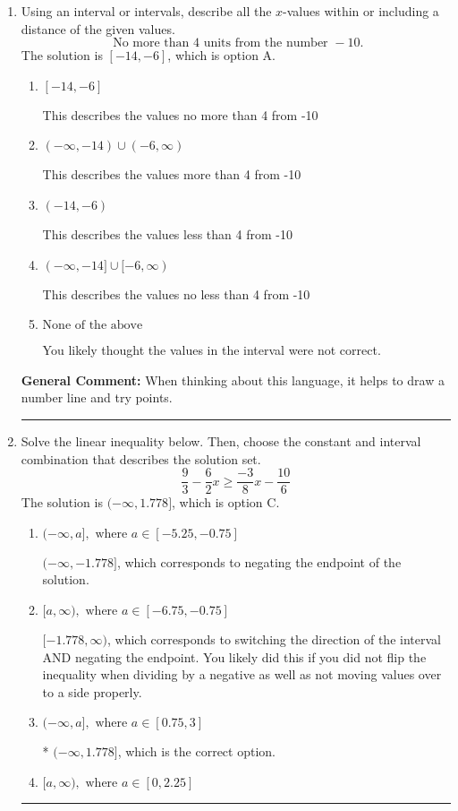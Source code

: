 \documentclass{extbook}[14pt]
\newcommand{\litem}[1]{\item #1

\rule{\textwidth}{0.4pt}}
\begin{document}
\begin{enumerate}\litem{
Using an interval or intervals, describe all the $x$-values within or including a distance of the given values.
\[ \text{ No more than } 4 \text{ units from the number } -10. \]The solution is \( [-14, -6] \), which is option A.\begin{enumerate}[label=\Alph*.]
\item \( [-14, -6] \)

This describes the values no more than 4 from -10
\item \( (-\infty, -14) \cup (-6, \infty) \)

This describes the values more than 4 from -10
\item \( (-14, -6) \)

This describes the values less than 4 from -10
\item \( (-\infty, -14] \cup [-6, \infty) \)

This describes the values no less than 4 from -10
\item \( \text{None of the above} \)

You likely thought the values in the interval were not correct.
\end{enumerate}

\textbf{General Comment:} When thinking about this language, it helps to draw a number line and try points.
}
\litem{
Solve the linear inequality below. Then, choose the constant and interval combination that describes the solution set.
\[ \frac{9}{3} - \frac{6}{2} x \geq \frac{-3}{8} x - \frac{10}{6} \]The solution is \( (-\infty, 1.778] \), which is option C.\begin{enumerate}[label=\Alph*.]
\item \( (-\infty, a], \text{ where } a \in [-5.25, -0.75] \)

 $(-\infty, -1.778]$, which corresponds to negating the endpoint of the solution.
\item \( [a, \infty), \text{ where } a \in [-6.75, -0.75] \)

 $[-1.778, \infty)$, which corresponds to switching the direction of the interval AND negating the endpoint. You likely did this if you did not flip the inequality when dividing by a negative as well as not moving values over to a side properly.
\item \( (-\infty, a], \text{ where } a \in [0.75, 3] \)

* $(-\infty, 1.778]$, which is the correct option.
\item \( [a, \infty), \text{ where } a \in [0, 2.25] \)


\end{enumerate}}
\end{enumerate}
\end{document}
